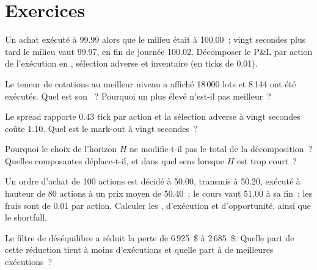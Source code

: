 \section{Exercices}

\begin{exercise}[$\star$]\label{exo:rs:measuring-market-making-and-execution:1}
Un achat exécuté à 99.99 alors que le milieu était à 100.00~; vingt secondes plus tard le milieu vaut 99.97, en fin de journée 100.02. Décomposer le P\&L par action de l'exécution en
, sélection adverse et inventaire (en ticks de 0.01).
\end{exercise}

\begin{exercise}[$\star$]\label{exo:rs:measuring-market-making-and-execution:2}
Le teneur de cotations au meilleur niveau a affiché 18\,000 lots et 8\,144 ont été exécutés. Quel est son ~? Pourquoi un  plus élevé n'est-il pas meilleur~?
\end{exercise}

\begin{exercise}[$\star$]\label{exo:rs:measuring-market-making-and-execution:3}
Le spread rapporte 0.43 tick par action et la sélection adverse à vingt secondes coûte 1.10. Quel est le mark-out à vingt secondes~?
\end{exercise}

\begin{exercise}[$\star\star$]\label{exo:rs:measuring-market-making-and-execution:4}
Pourquoi le choix de l'horizon $H$ ne modifie-t-il pas le total de la décomposition~? Quelles composantes déplace-t-il, et dans quel sens lorsque $H$ est trop court~?
\end{exercise}

\begin{exercise}[$\star\star$]\label{exo:rs:measuring-market-making-and-execution:5}
Un ordre d'achat de 100 actions est décidé à 50.00, transmis à 50.20, exécuté à hauteur de 80 actions à un prix moyen de 50.40~; le cours vaut 51.00 à sa fin~; les frais sont de 0.01 par action.
Calculer les , d'exécution et d'opportunité, ainsi que le shortfall.
\end{exercise}

\begin{exercise}[$\star\star$]\label{exo:rs:measuring-market-making-and-execution:6}
Le filtre de déséquilibre a réduit la perte de 6\,925~\$ à 2\,685~\$. Quelle part de cette réduction tient à moins d'exécutions et quelle part à de meilleures exécutions~?
\end{exercise}

